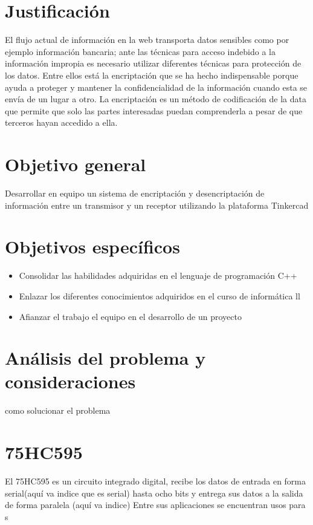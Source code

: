 \documentclass{article}
\begin{document}
\section{Justificación} 
\label{contenido}
El flujo actual de información en la web transporta datos sensibles como por ejemplo información bancaria; ante las técnicas para acceso indebido a la información impropia es necesario utilizar diferentes técnicas para protección de los datos. Entre ellos está la encriptación que se ha hecho indispensable porque ayuda a proteger y mantener la confidencialidad de la información cuando esta se envía de un lugar a otro. La encriptación es un método de codificación de la data que permite que solo las partes interesadas puedan comprenderla a pesar de que terceros hayan accedido a ella.

\section{Objetivo general} 
\label{contenido}
Desarrollar en equipo un sistema de encriptación y desencriptación de información entre un transmisor y un receptor utilizando la plataforma Tinkercad

\section{Objetivos específicos} 
\label{contenido}
\begin{itemize}
\item Consolidar las habilidades adquiridas en el lenguaje de programación C++
\item Enlazar los diferentes conocimientos adquiridos en el curso de informática ll 
\item Afianzar el trabajo el equipo en el desarrollo de un proyecto

\end{itemize}
\section{Análisis del problema y consideraciones} 
como solucionar el problema


\section{75HC595} 
El 75HC595 es un circuito integrado digital, recibe los datos de entrada en forma serial(aquí va indice que es serial) hasta ocho bits y entrega sus datos a la salida de forma paralela (aquí va indice)
Entre sus aplicaciones se encuentran usos para s
\end{document}
